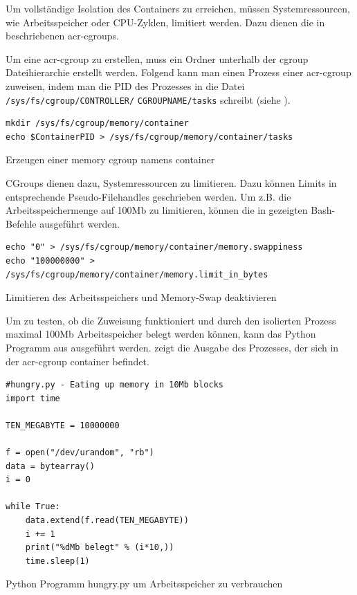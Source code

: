 Um vollständige Isolation des Containers zu erreichen, müssen Systemressourcen, wie Arbeitsspeicher oder CPU-Zyklen, limitiert werden. Dazu dienen die in  beschriebenen \glspl{acr-cgroup}.

Um eine \gls{acr-cgroup} zu erstellen, muss ein Ordner unterhalb der cgroup Dateihierarchie erstellt werden. Folgend kann man einen Prozess einer \gls{acr-cgroup} zuweisen, indem man die PID des Prozesses in die Datei \texttt{/sys/fs/cgroup/CONTROLLER/} \texttt{CGROUPNAME/tasks} schreibt (siehe ).

\begin{listing}[h]
	\begin{verbatim}
mkdir /sys/fs/cgroup/memory/container
echo $ContainerPID > /sys/fs/cgroup/memory/container/tasks
	\end{verbatim}
	\caption{Erzeugen einer memory cgroup namens container}
	\label{lst:cgroupZuweisen}
\end{listing}

CGroups dienen dazu, Systemressourcen zu limitieren. Dazu können Limits in entsprechende Pseudo-Filehandles geschrieben werden. Um z.B. die Arbeitsspeichermenge auf \tildeawesome100Mb zu limitieren, können die in  gezeigten Bash-Befehle ausgeführt werden. 

\begin{listing}[h]
	\begin{verbatim}
echo "0" > /sys/fs/cgroup/memory/container/memory.swappiness
echo "100000000" > /sys/fs/cgroup/memory/container/memory.limit_in_bytes
	\end{verbatim}
	\caption{Limitieren des Arbeitsspeichers und Memory-Swap deaktivieren}
	\label{lst:limitRam}
\end{listing}

Um zu testen, ob die Zuweisung funktioniert und durch den isolierten Prozess maximal \tildeawesome100Mb Arbeitsspeicher belegt werden können, kann das Python Programm aus  ausgeführt werden.  zeigt die Ausgabe des Prozesses, der sich in der \gls{acr-cgroup} container befindet.

\begin{listing}[hp]
	\begin{verbatim}
#hungry.py - Eating up memory in 10Mb blocks
import time

TEN_MEGABYTE = 10000000

f = open("/dev/urandom", "rb")
data = bytearray()
i = 0

while True:
	data.extend(f.read(TEN_MEGABYTE))
	i += 1
	print("%dMb belegt" % (i*10,))
	time.sleep(1)
	\end{verbatim}
	\caption{Python Programm hungry.py um Arbeitsspeicher zu verbrauchen}
	\label{lst:hungry-py}
\end{listing}


